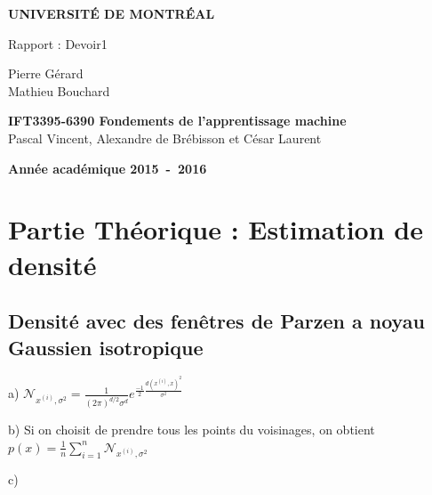 \documentclass[a4paper,10pt]{article}
\begin{document}
\begin{titlepage}
\begin{center}
\textbf{\textsc{UNIVERSIT\'E DE MONTR\'EAL}}\\
\vfill{}\vfill{}
\begin{center}{\Huge Rapport : Devoir1 }\end{center}{\Huge \par}
\begin{center}{\large Pierre Gérard \\ Mathieu Bouchard}\end{center}{\Huge \par}
\vfill{}\vfill{} \vfill{}
\begin{center}{\large \textbf{IFT3395-6390 Fondements de l'apprentissage machine}}\hfill{\\Pascal Vincent, Alexandre de Brébisson et César Laurent}\end{center}{\large\par}
\vfill{}\vfill{}\enlargethispage{3cm}
\textbf{Année académique 2015~-~2016}
\end{center}
\end{titlepage}



\tableofcontents

\pagebreak

\section{Partie Théorique : Estimation de densité}

\subsection{Densité avec des fenêtres de Parzen a noyau Gaussien isotropique}

a) $\mathcal{N}_{x^{(i)}, \sigma^{2}} = \frac{1}{(2 \pi)^{d/2} \sigma^{d}} e^{ \frac{-1}{2} \frac{d(x^{(i)},x)^{2}}{\sigma^{2}} } $



b) Si on choisit de prendre tous les points du voisinages, on obtient
$ p(x) =  \frac{1}{n} \sum_{i=1}^{n} \mathcal{N}_{x^{(i)}, \sigma^{2}} $

c) 
\end{document}
